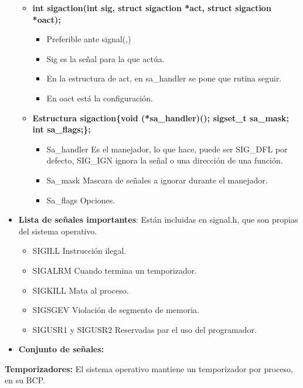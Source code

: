 \documentclass[12pt, twoside, openright]{report} %
\begin{document}
\begin{itemize}
    \begin{itemize}
    \item \textbf{int sigaction(int sig, struct sigaction *act, struct
      sigaction *oact);}
      

      \begin{itemize}
      \item Preferible ante signal(,)
        
      \item Sig es la señal para la que actúa.
        
      \item En la estructura de act, en sa\_handler se pone que rutina
        seguir.
        
      \item En oact está la configuración.
        
      \end{itemize}
	  \pagebreak
    \item \textbf{Estructura sigaction\{void (*sa\_handler)(); sigset\_t
      sa\_mask; int sa\_flags;\};}
      

      \begin{itemize}
      \item Sa\_handler Es el manejador, lo que hace, puede ser SIG\_DFL por
        defecto, SIG\_IGN ignora la señal o una dirección de una
        función.
        
      \item Sa\_mask Mascara de señales a ignorar durante el manejador.
        
      \item Sa\_flags Opciones.
        
      \end{itemize}
    \end{itemize}
  \item \textbf{Lista de señales importantes}: Están incluidas en signal.h,
    que son propias del sistema operativo.
    

    \begin{itemize}
    \item SIGILL Instrucción ilegal.
      
    \item SIGALRM Cuando termina un temporizador.
      
    \item SIGKILL Mata al proceso.
      
    \item SIGSGEV Violación de segmento de memoria.
      
    \item SIGUSR1 y SIGUSR2 Reservadas par el uso del programador.
      
    \end{itemize}
  \item \textbf{Conjunto de señales:}
    
  \end{itemize}
\textbf{Temporizadores:} El sistema operativo mantiene un temporizador
  por proceso, en su BCP.
  
\end{document}
